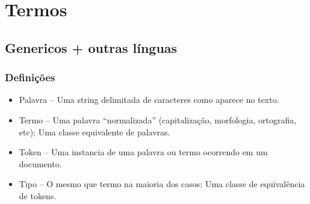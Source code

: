 \documentclass[compress]{beamer}
\begin{document}
\section{Termos}

\subsection{Genericos + outras línguas}

\begin{frame}
\frametitle{Definições}
\begin{itemize}[<+->]
\item {\color{blue}Palavra} -- Uma string delimitada de caracteres como aparece 
no texto.
\item {\color{blue}Termo} -- Uma palavra ``normalizada'' (capitalização, 
morfologia, ortografia, etc); Uma classe equivalente de palavras.
\item {\color{blue}Token} -- Uma instancia de uma palavra ou termo ocorrendo em 
um documento.
\item {\color{blue}Tipo} -- O mesmo que termo na maioria dos casos: Uma classe 
de equivalência de tokens.
\end{itemize}
\end{frame}
\end{document}

